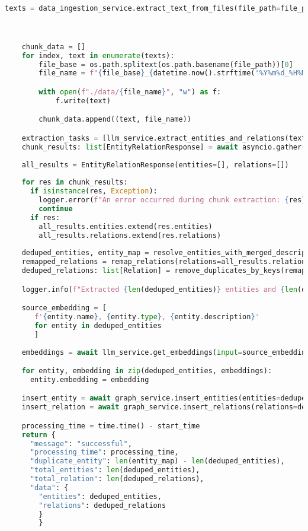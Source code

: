 \begin{lstlisting}[numbers=none, language=python]
    texts = data_ingestion_service.extract_text_from_files(file_path=file_path, type=file_type, split=split)



    chunk_data = []
    for index, text in enumerate(texts):
        file_base = os.path.splitext(os.path.basename(file_path))[0]
        file_name = f"{file_base}_{datetime.now().strftime('%Y%m%d_%H%M%S')}_chunk{index+1}.txt"

        with open(f"./data/{file_name}", "w") as f:
            f.write(text)

        chunk_data.append((text, file_name))

    extraction_tasks = [llm_service.extract_entities_and_relations(text=text, chunk_id=file_name) for text, file_name in chunk_data]
    chunk_results: list[EntityRelationResponse] = await asyncio.gather(*extraction_tasks, return_exceptions=True)
    
    all_results = EntityRelationResponse(entities=[], relations=[])
    
    for res in chunk_results:
      if isinstance(res, Exception):
        logger.error(f"An error occurred during chunk extraction: {res}")
        continue
      if res:
        all_results.entities.extend(res.entities)
        all_results.relations.extend(res.relations)
  
    deduped_entities, entity_map = resolve_entities_with_merged_descriptions(entities=all_results.entities)
    remapped_relations = remap_relations(relations=all_results.relations, entity_name_map=entity_map)
    deduped_relations: list[Relation] = remove_duplicates_by_keys(remapped_relations, keys=["source_entity", "target_entity", "name", "type"])

    logger.info(f"Extracted {len(deduped_entities)} entities and {len(deduped_relations)} relations.")

    source_embedding = [
       f'{entity.name}, {entity.type}, {entity.description}'
       for entity in deduped_entities
       ]
    
    embeddings = await llm_service.get_embeddings(input=source_embedding, task="RETRIEVAL_DOCUMENT")

    for entity, embedding in zip(deduped_entities, embeddings):
      entity.embedding = embedding

    insert_entity = await graph_service.insert_entities(entities=deduped_entities)
    insert_relation = await graph_service.insert_relations(relations=deduped_relations)

    processing_time = time.time() - start_time
    return {
      "message": "successful",
      "processing_time": processing_time,
      "duplicate_entity": len(entity_map) - len(deduped_entities),
      "total_entities": len(deduped_entities),
      "total_relation": len(deduped_relations),
      "data": {
        "entities": deduped_entities,
        "relations": deduped_relations
        }
        }


\end{lstlisting}
